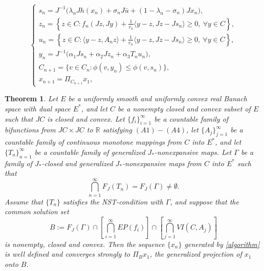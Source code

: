 \documentclass[10pt,a4paper]{amsart}
\newtheorem{theorem}{Theorem}
\begin{document}
\begin{equation}\label{algorithm}
\left\{
\begin{array}{ll}
s_n=J^{-1}\big(\lambda_nJh(x_n)+\sigma_nJ\bar u+(1-\lambda_n-\sigma_n)Jx_n\big),\\[2mm]
z_n=\left\{z\in C:f_n(Jz,Jy)+\frac{1}{r_n}\langle y-z,Jz-Js_n\rangle\geq 0,\ \forall y\in C\right\},\\[2mm]
u_n=\left\{z\in C:\langle y-z,A_nz\rangle+\frac{1}{r_n}\langle y-z,Jz-Js_n\rangle\geq 0,\ \forall y\in C\right\},\\[2mm]
y_n=J^{-1}\big(\alpha_1Js_n+\alpha_2Jz_n+\alpha_3T_nu_n\big),\\[2mm]
C_{n+1}=\{v\in C_n:\phi(v,y_n)\leq \phi(v,s_n)\},\\[2mm]
x_{n+1}=\Pi_{C_{n+1}}x_1,
\end{array}
\right.
\end{equation}

\begin{theorem}\label{mainthm}
Let $E$ be a uniformly smooth and uniformly convex real Banach space with dual space $E^{*}$, and let $C$ be a nonempty closed and convex subset of $E$ such that $JC$ is closed and convex. Let $\{f_i\}_{i=1}^{\infty}$ be a countable family of bifunctions from $JC\times JC$ to $\mathbb{R}$ satisfying $(A1)-(A4)$, let $\{A_j\}_{j=1}^{\infty}$ be a countable family of continuous monotone mappings from $C$ into $E^{*}$, and let $\{T_n\}_{n=1}^{\infty}$ be a countable family of generalized $J_{*}$-nonexpansive maps. Let $\Gamma$ be a family of $J_{*}$-closed and generalized $J_{*}$-nonexpansive maps from $C$ into $E^{*}$ such that
\[
\bigcap_{n=1}^{\infty}F_J(T_n)=F_J(\Gamma)\neq\emptyset.
\]
Assume that $\{T_n\}$ satisfies the NST-condition with $\Gamma$, and suppose that the common solution set
\[
B:=F_J(\Gamma)\cap\left[\bigcap_{i=1}^{\infty}EP(f_i)\right]\cap\left[\bigcap_{j=1}^{\infty}VI(C,A_j)\right]
\]
is nonempty, closed and convex. Then the sequence $\{x_n\}$ generated by \eqref{algorithm} is well defined and converges strongly to $\Pi_Bx_1$, the generalized projection of $x_1$ onto $B$.
\end{theorem}
\end{document}
